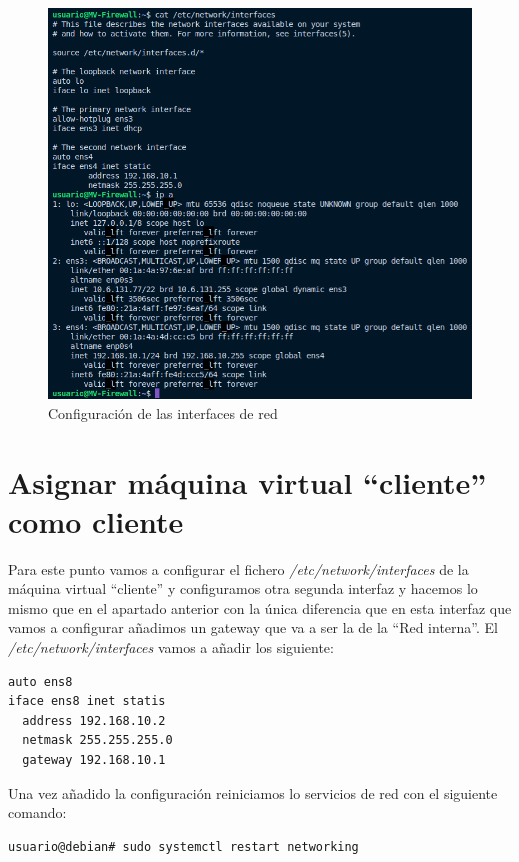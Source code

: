 \documentclass{report}
\begin{document}
  \begin{figure}[H]
    \centering
    \includegraphics[scale=0.6]{img/configuracion_interfaces_firewall.png}
    \caption{Configuración de las interfaces de red}
    \label{fig:configuracion_interfaces}
  \end{figure}

  \cleardoublepage

  \chapter{Asignar máquina virtual “cliente” como cliente}
  Para este punto vamos a configurar el fichero \emph{/etc/network/interfaces} de la máquina virtual “cliente” y configuramos otra segunda interfaz y hacemos lo mismo que en el apartado anterior con la única diferencia que en esta interfaz que vamos a configurar añadimos un gateway que va a ser la de la “Red interna”.
  El \emph{/etc/network/interfaces} vamos a añadir los siguiente:

  \begin{verbatim}
auto ens8
iface ens8 inet statis
  address 192.168.10.2
  netmask 255.255.255.0
  gateway 192.168.10.1
  \end{verbatim}

  Una vez añadido la configuración reiniciamos lo servicios de red con el siguiente comando:

  \begin{verbatim}
usuario@debian# sudo systemctl restart networking
  \end{verbatim}
\end{document}

